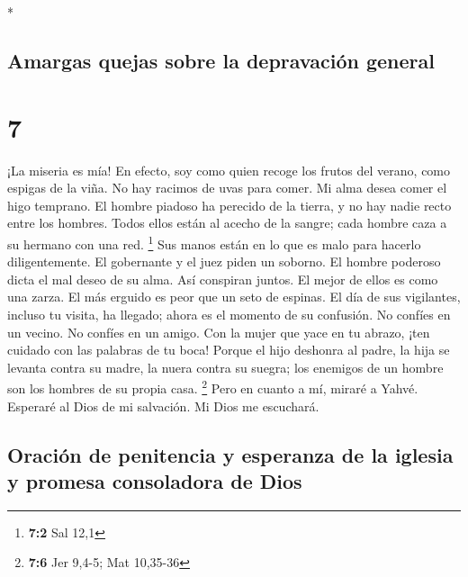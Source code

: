 \begin{paracol}{2}
\begin{otherlanguage}{english}
\end{otherlanguage}

\switchcolumn[0]*

\hypertarget{amargas-quejas-sobre-la-depravaciuxf3n-general}{%
\subsection{Amargas quejas sobre la depravación
general}\label{amargas-quejas-sobre-la-depravaciuxf3n-general}}

\hypertarget{section-12}{%
\section{7}\label{section-12}}

 ¡La miseria es mía! En efecto, soy como quien recoge los
frutos del verano, como espigas de la viña. No hay racimos de uvas para
comer. Mi alma desea comer el higo temprano.  El hombre
piadoso ha perecido de la tierra, y no hay nadie recto entre los
hombres. Todos ellos están al acecho de la sangre; cada hombre caza a su
hermano con una red. \footnote{\textbf{7:2} Sal 12,1}  Sus
manos están en lo que es malo para hacerlo diligentemente. El gobernante
y el juez piden un soborno. El hombre poderoso dicta el mal deseo de su
alma. Así conspiran juntos.  El mejor de ellos es como una
zarza. El más erguido es peor que un seto de espinas. El día de sus
vigilantes, incluso tu visita, ha llegado; ahora es el momento de su
confusión.  No confíes en un vecino. No confíes en un
amigo. Con la mujer que yace en tu abrazo, ¡ten cuidado con las palabras
de tu boca!  Porque el hijo deshonra al padre, la hija se
levanta contra su madre, la nuera contra su suegra; los enemigos de un
hombre son los hombres de su propia casa. \footnote{\textbf{7:6} Jer
  9,4-5; Mat 10,35-36}  Pero en cuanto a mí, miraré a
Yahvé. Esperaré al Dios de mi salvación. Mi Dios me escuchará.

\hypertarget{oraciuxf3n-de-penitencia-y-esperanza-de-la-iglesia-y-promesa-consoladora-de-dios}{%
\subsection{Oración de penitencia y esperanza de la iglesia y promesa
consoladora de
Dios}\label{oraciuxf3n-de-penitencia-y-esperanza-de-la-iglesia-y-promesa-consoladora-de-dios}}


\end{paracol}
